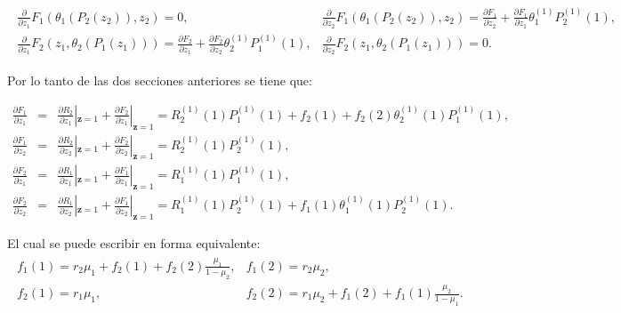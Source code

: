 \documentclass{article}
\numberwithin{equation}{section}
\begin{document}
\begin{eqnarray*}
\begin{array}{ll}
\frac{\partial}{\partial
z_{1}}F_{1}\left(\theta_{1}\left(P_{2}\left(z_{2}\right)\right),z_{2}\right)=0,&
\frac{\partial}{\partial
z_{2}}F_{1}\left(\theta_{1}\left(P_{2}\left(z_{2}\right)\right),z_{2}\right)=\frac{\partial
F_{1}}{\partial z_{2}}+\frac{\partial F_{1}}{\partial
z_{1}}\theta_{1}^{(1)}P_{2}^{(1)}\left(1\right),\\
\frac{\partial}{\partial
z_{1}}F_{2}\left(z_{1},\theta_{2}\left(P_{1}\left(z_{1}\right)\right)\right)=\frac{\partial
F_{2}}{\partial z_{1}}+\frac{\partial F_{2}}{\partial
z_{2}}\theta_{2}^{(1)}P_{1}^{(1)}\left(1\right),&
\frac{\partial}{\partial
z_{2}}F_{2}\left(z_{1},\theta_{2}\left(P_{1}\left(z_{1}\right)\right)\right)=0.
\end{array}
\end{eqnarray*}


Por lo tanto de las dos secciones anteriores se tiene que:


\begin{eqnarray*}
\frac{\partial F_{1}}{\partial z_{1}}&=&\frac{\partial
R_{2}}{\partial z_{1}}|_{\mathbf{z}=1}+\frac{\partial F_{2}}{\partial z_{1}}|_{\mathbf{z}=1}=R_{2}^{(1)}\left(1\right)P_{1}^{(1)}\left(1\right)+f_{2}\left(1\right)+f_{2}\left(2\right)\theta_{2}^{(1)}\left(1\right)P_{1}^{(1)}\left(1\right),\\
\frac{\partial F_{1}}{\partial z_{2}}&=&\frac{\partial
R_{2}}{\partial z_{2}}|_{\mathbf{z}=1}+\frac{\partial F_{2}}{\partial z_{2}}|_{\mathbf{z}=1}=R_{2}^{(1)}\left(1\right)P_{2}^{(1)}\left(1\right),\\
\frac{\partial F_{2}}{\partial z_{1}}&=&\frac{\partial
R_{1}}{\partial z_{1}}|_{\mathbf{z}=1}+\frac{\partial F_{1}}{\partial z_{1}}|_{\mathbf{z}=1}=R_{1}^{(1)}\left(1\right)P_{1}^{(1)}\left(1\right),\\
\frac{\partial F_{2}}{\partial z_{2}}&=&\frac{\partial
R_{1}}{\partial z_{2}}|_{\mathbf{z}=1}+\frac{\partial F_{1}}{\partial z_{2}}|_{\mathbf{z}=1}
=R_{1}^{(1)}\left(1\right)P_{2}^{(1)}\left(1\right)+f_{1}\left(1\right)\theta_{1}^{(1)}\left(1\right)P_{2}^{(1)}\left(1\right).
\end{eqnarray*}


El cual se puede escribir en forma equivalente:
\begin{eqnarray*}
\begin{array}{ll}
f_{1}\left(1\right)=r_{2}\mu_{1}+f_{2}\left(1\right)+f_{2}\left(2\right)\frac{\mu_{1}}{1-\mu_{2}},&
f_{1}\left(2\right)=r_{2}\mu_{2},\\
f_{2}\left(1\right)=r_{1}\mu_{1},&
f_{2}\left(2\right)=r_{1}\mu_{2}+f_{1}\left(2\right)+f_{1}\left(1\right)\frac{\mu_{2}}{1-\mu_{1}}.
\end{array}
\end{eqnarray*}
\end{document}
